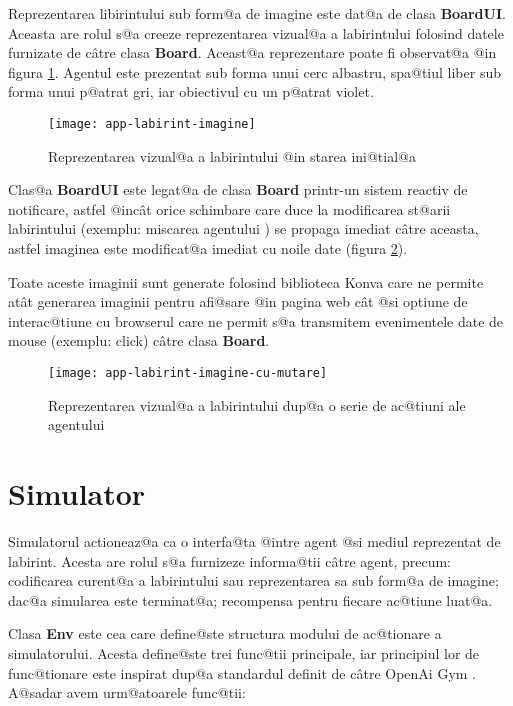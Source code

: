 Reprezentarea libirintului sub form@a de imagine este dat@a de clasa \textbf{BoardUI}. Aceasta are rolul s@a creeze reprezentarea vizual@a a labirintului folosind datele furnizate de c\^ atre clasa \textbf{Board}. Aceast@a reprezentare poate fi observat@a @in figura \ref{fig:labirint-imagine}. Agentul este prezentat sub forma unui cerc albastru, spa@tiul liber sub forma unui p@atrat gri, iar obiectivul cu un p@atrat violet.

\begin{figure}[h]
	\centering
	\texttt{[image: app-labirint-imagine]}
	\caption{Reprezentarea vizual@a a labirintului @in starea ini@tial@a}
	\label{fig:labirint-imagine}
\end{figure}

Clas@a \textbf{BoardUI} este legat@a de clasa \textbf{Board} printr-un sistem reactiv de notificare, astfel @inc\^ at orice schimbare care duce la modificarea st@arii labirintului (exemplu: miscarea agentului ) se propaga imediat c\^ atre aceasta, astfel imaginea este modificat@a imediat cu noile date (figura \ref{fig:labirint-imagine-cu-mutare}).

Toate aceste imaginii sunt generate folosind biblioteca Konva care ne permite at\^ at generarea imaginii pentru afi@sare @in pagina web c\^ at @si optiune de interac@tiune cu browserul care ne permit s@a transmitem evenimentele date de mouse (exemplu: click) c\^ atre clasa \textbf{Board}.

\begin{figure}[h]
	\centering
	\texttt{[image: app-labirint-imagine-cu-mutare]}
	\caption{Reprezentarea vizual@a a labirintului dup@a o serie de ac@tiuni ale agentului}
	\label{fig:labirint-imagine-cu-mutare}
\end{figure}


\section{Simulator}

Simulatorul actioneaz@a ca o interfa@ta @intre agent @si mediul reprezentat de labirint. Acesta are rolul s@a furnizeze informa@tii c\^ atre agent, precum: codificarea curent@a a labirintului sau reprezentarea sa sub form@a de imagine; dac@a simularea este terminat@a; recompensa pentru fiecare ac@tiune luat@a.

Clasa \textbf{Env} este cea care define@ste structura modului de ac@tionare a simulatorului. Acesta define@ste trei func@tii principale, iar principiul lor de func@tionare este inspirat dup@a standardul definit de c\^ atre OpenAi Gym \cite{open-ai-gym-env-format}. A@sadar avem urm@atoarele func@tii:

